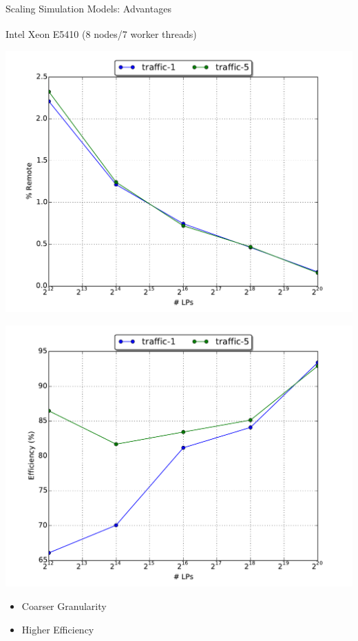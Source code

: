 \documentclass[10pt]{beamer}
\begin{document}
\begin{frame}{Scaling Simulation Models: Advantages}
    \begin{block}{Intel\textsuperscript{\textregistered} Xeon\textsuperscript{\textregistered}
        E5410 (8 nodes/7 worker threads)}\end{block}
    \begin{minipage}{0.5\textwidth}
        \includegraphics[width=1.1\textwidth]{../figs/scale/scale_premote_traffic.pdf}
    \end{minipage}%
    \begin{minipage}{0.5\textwidth}
        \includegraphics[width=1.1\textwidth]{../figs/scale/scale_efficiency_traffic.pdf}
    \end{minipage}
    \begin{itemize}
        \item Coarser Granularity
        \item Higher Efficiency
    \end{itemize}
\end{frame}
\end{document}
